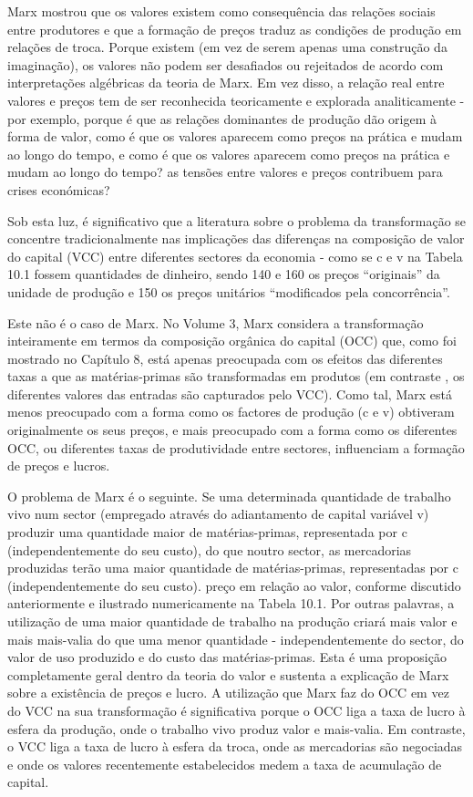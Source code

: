 \par 
Marx mostrou que os valores existem como consequência das relações sociais entre produtores e que a formação de preços traduz as condições de produção em relações de troca. Porque existem (em vez de serem apenas uma construção da imaginação), os valores não podem ser desafiados ou rejeitados de acordo com interpretações algébricas da teoria de Marx. Em vez disso, a relação real entre valores e preços tem de ser reconhecida teoricamente e explorada analiticamente - por exemplo, porque é que as relações dominantes de produção dão origem à forma de valor, como é que os valores aparecem como preços na prática e mudam ao longo do tempo, e como é que os valores aparecem como preços na prática e mudam ao longo do tempo? as tensões entre valores e preços contribuem para crises económicas?
 \par 
Sob esta luz, é significativo que a literatura sobre o problema da transformação se concentre tradicionalmente nas implicações das diferenças na composição de valor do capital (VCC) entre diferentes sectores da economia - como se c e v na Tabela {\color{blue}10}.{\color{blue}1} fossem quantidades de dinheiro, sendo {\color{blue}140} e {\color{blue}160} os preços “originais” da unidade de produção e {\color{blue}150} os preços unitários “modificados pela concorrência”.
 \par 
Este não é o caso de Marx. No Volume 3, Marx considera a transformação inteiramente em termos da composição orgânica do capital (OCC) que, como foi mostrado no Capítulo 8, está apenas preocupada com os efeitos das diferentes taxas a que as matérias-primas são transformadas em produtos (em contraste , os diferentes valores das entradas são capturados pelo VCC). Como tal, Marx está menos preocupado com a forma como os factores de produção (c e v) obtiveram originalmente os seus preços, e mais preocupado com a forma como os diferentes OCC, ou diferentes taxas de produtividade entre sectores, influenciam a formação de preços e lucros.
 \par 
O problema de Marx é o seguinte. Se uma determinada quantidade de trabalho vivo num sector (empregado através do adiantamento de capital variável v) produzir uma quantidade maior de matérias-primas, representada por c (independentemente do seu custo), do que noutro sector, as mercadorias produzidas terão uma maior quantidade de matérias-primas, representadas por c (independentemente do seu custo). preço em relação ao valor, conforme discutido anteriormente e ilustrado numericamente na Tabela {\color{blue}10}.{\color{blue}1}. Por outras palavras, a utilização de uma maior quantidade de trabalho na produção criará mais valor e mais mais-valia do que uma menor quantidade - independentemente do sector, do valor de uso produzido e do custo das matérias-primas. Esta é uma proposição completamente geral dentro da teoria do valor e sustenta a explicação de Marx sobre a existência de preços e lucro. A utilização que Marx faz do OCC em vez do VCC na sua transformação é significativa porque o OCC liga a taxa de lucro à esfera da produção, onde o trabalho vivo produz valor e mais-valia. Em contraste, o VCC liga a taxa de lucro à esfera da troca, onde as mercadorias são negociadas e onde os valores recentemente estabelecidos medem a taxa de acumulação de capital.
